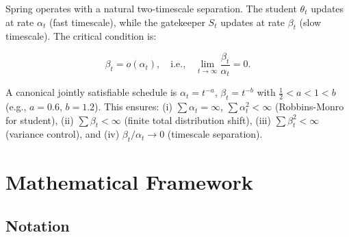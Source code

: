 \documentclass[11pt,a4paper]{article}
\theoremstyle{plain}
\theoremstyle{definition}
\theoremstyle{remark}
\begin{document}
Spring operates with a natural two-timescale separation. The student $\theta_t$ updates at rate $\alpha_t$ (fast timescale), while the gatekeeper $S_t$ updates at rate $\beta_t$ (slow timescale). The critical condition is:

\begin{equation}\label{eq:twotimescale}
    \beta_t = o(\alpha_t), \quad \text{i.e.,} \quad \lim_{t \to \infty} \frac{\beta_t}{\alpha_t} = 0.
\end{equation}

A canonical jointly satisfiable schedule is $\alpha_t = t^{-a}$, $\beta_t = t^{-b}$ with $\frac{1}{2} < a < 1 < b$ (e.g., $a = 0.6$, $b = 1.2$). This ensures: (i) $\sum \alpha_t = \infty$, $\sum \alpha_t^2 < \infty$ (Robbins-Monro for student), (ii) $\sum \beta_t < \infty$ (finite total distribution shift), (iii) $\sum \beta_t^2 < \infty$ (variance control), and (iv) $\beta_t/\alpha_t \to 0$ (timescale separation).

\section{Mathematical Framework}

\subsection{Notation}
\end{document}
